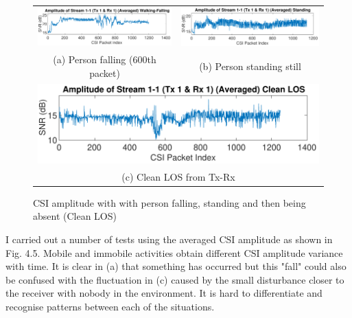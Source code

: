 \vspace{11pt}
\begin{figure}[H]
\centering
\begin{tabular}{cc}
  \includegraphics[scale = 0.5]{Figures/walkingFallingAveraged.pdf} &   \includegraphics[scale=0.5]{Figures/standingForAmplitude.pdf} \\
(a) Person falling (600th packet) & (b) Person standing still \\[6pt]
\multicolumn{2}{c}{\includegraphics[scale = 0.5]{Figures/cleanLOSForAmplitude.pdf} }\\
\multicolumn{2}{c}{(c) Clean LOS from Tx-Rx}
\end{tabular}
\caption{CSI amplitude with with person falling, standing and then being absent (Clean LOS)}
\label{fig:diffamplitudes}%
\end{figure}
I carried out a number of tests using the averaged CSI amplitude as shown in Fig. 4.5. Mobile and immobile activities obtain different CSI amplitude variance with time. It is clear in (a) that something has occurred but this "fall" could also be confused with the fluctuation in (c) caused by the small disturbance closer to the receiver with nobody in the environment. It is hard to differentiate and recognise patterns between each of the situations. 
